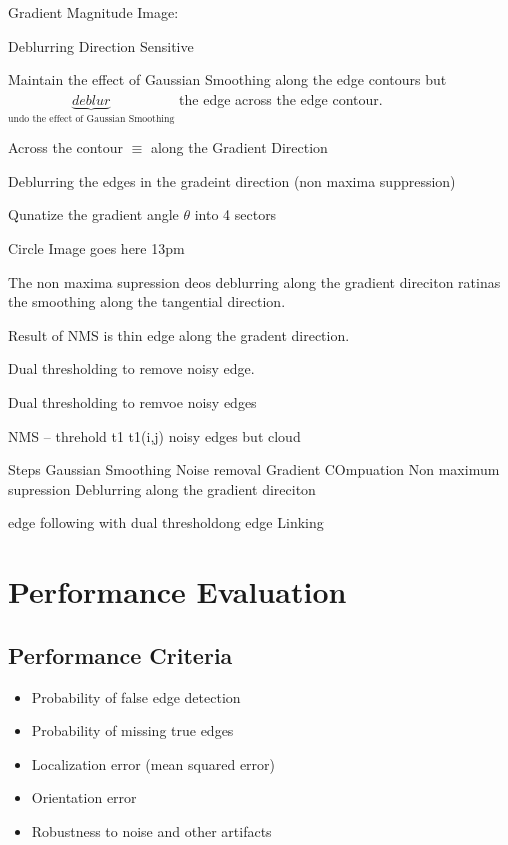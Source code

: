 \documentclass[11pt]{article}
\theoremstyle{definition}
\begin{document}
Gradient Magnitude Image:

Deblurring Direction Sensitive

Maintain the effect of Gaussian Smoothing along the edge contours but \\ $\underbrace{deblur}_{\text{undo the effect of Gaussian Smoothing}}$ the edge across the edge contour.


Across the contour $\equiv$ along the Gradient Direction 


Deblurring the edges in the gradeint direction (non maxima suppression)

Qunatize the gradient angle $\theta$ into 4 sectors


Circle Image goes here 13pm 

The non maxima supression deos deblurring along the gradient direciton ratinas the smoothing along the tangential direction.

Result of NMS is thin edge along the gradent direction.

Dual thresholding to remove noisy edge.

Dual thresholding to remvoe noisy edges


NMS -- threhold t1 t1(i,j) noisy edges but cloud

Steps Gaussian Smoothing Noise removal
Gradient COmpuation  
Non maximum supression Deblurring along the gradient direciton

edge following with dual thresholdong edge Linking

\newpage
\pagestyle{fancy} %

\section*{Performance Evaluation}

\subsection*{Performance Criteria}
\begin{itemize}
    \item Probability of false edge detection
    \item Probability of missing true edges
    \item Localization error (mean squared error)
    \item Orientation error
    \item Robustness to noise and other artifacts
\end{itemize}
\end{document}

